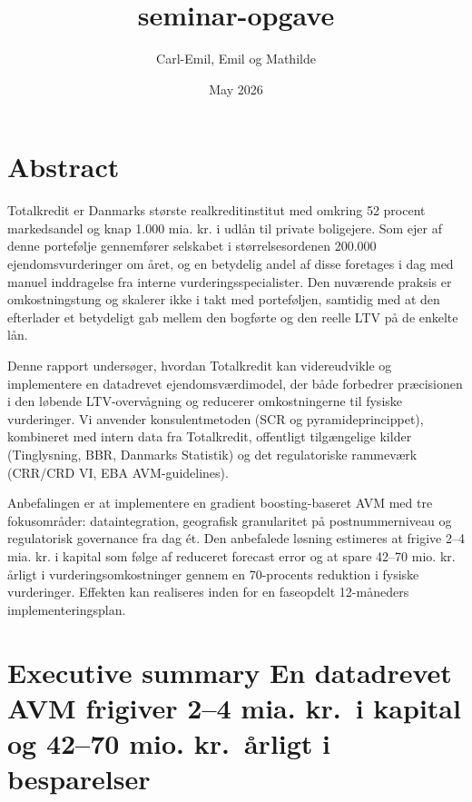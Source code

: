 \documentclass[12pt]{article}
\title{seminar-opgave}
\author{Carl-Emil, Emil og Mathilde}
\date{May 2026}
\begin{document}
\usepackage{pagecolor}

\pagecolor[HTML]{F4F4F4}

\maketitle

\section*{Abstract}
Totalkredit er Danmarks største realkreditinstitut med omkring 52 procent markedsandel og knap 1.000 mia. kr. i udlån til private boligejere. Som ejer af denne portefølje gennemfører selskabet i størrelsesordenen 200.000 ejendomsvurderinger om året, og en betydelig andel af disse foretages i dag med manuel inddragelse fra interne vurderingsspecialister. Den nuværende praksis er omkostningstung og skalerer ikke i takt med porteføljen, samtidig med at den efterlader et betydeligt gab mellem den bogførte og den reelle LTV på de enkelte lån.

Denne rapport undersøger, hvordan Totalkredit kan videreudvikle og implementere en datadrevet ejendomsværdimodel, der både forbedrer præcisionen i den løbende LTV-overvågning og reducerer omkostningerne til fysiske vurderinger. Vi anvender konsulentmetoden (SCR og pyramideprincippet), kombineret med intern data fra Totalkredit, offentligt tilgængelige kilder (Tinglysning, BBR, Danmarks Statistik) og det regulatoriske rammeværk (CRR/CRD VI, EBA AVM-guidelines).

Anbefalingen er at implementere en gradient boosting-baseret AVM med tre fokusområder: dataintegration, geografisk granularitet på postnummerniveau og regulatorisk governance fra dag ét. Den anbefalede løsning estimeres at frigive 2--4 mia. kr. i kapital som følge af reduceret forecast error og at spare 42--70 mio. kr. årligt i vurderingsomkostninger gennem en 70-procents reduktion i fysiske vurderinger. Effekten kan realiseres inden for en faseopdelt 12-måneders implementeringsplan.

\newpage

\tableofcontents
\newpage

\section{Executive summary \textbar{} En datadrevet AVM frigiver 2--4 mia. kr.\ i kapital og 42--70 mio. kr.\ årligt i besparelser}
\label{sec:exec}
\end{document}
